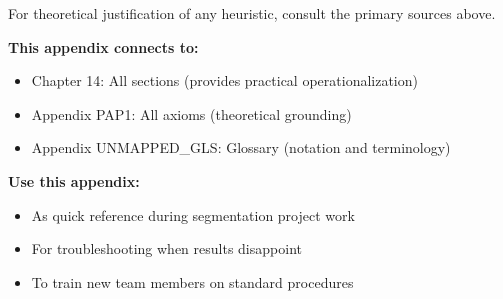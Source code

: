 For theoretical justification of any heuristic, consult the primary sources above.

\vspace{1em}

\noindent
\cite{rogers2003diffusion, angrist2010mostly, thaler2008nudge}

\vspace{0.5em}

\noindent
\nocite{bcm_master}


\begin{tcolorbox}[colback=white, colframe=black, title=Cross-Reference Footer]

\textbf{This appendix connects to:}
\begin{itemize}[nosep]
\item Chapter 14: All sections (provides practical operationalization)
\item Appendix PAP1: All axioms (theoretical grounding)
\item Appendix UNMAPPED_GLS: Glossary (notation and terminology)
\end{itemize}

\textbf{Use this appendix:}
\begin{itemize}[nosep]
\item As quick reference during segmentation project work
\item For troubleshooting when results disappoint
\item To train new team members on standard procedures
\end{itemize}

\end{tcolorbox}


